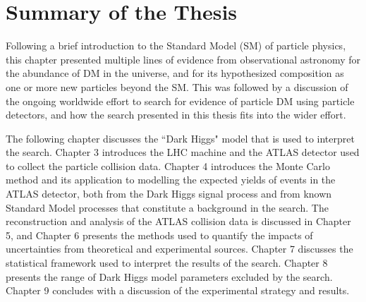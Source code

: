 \section{Summary of the Thesis}

Following a brief introduction to the Standard Model (SM) of particle physics, this chapter presented multiple lines of evidence from observational astronomy for the abundance of DM in the universe, and for its hypothesized composition as one or more new particles beyond the SM. This was followed by a discussion of the ongoing worldwide effort to search for evidence of particle DM using particle detectors, and how the search presented in this thesis fits into the wider effort. 

The following chapter discusses the ``Dark Higgs" model that is used to interpret the search. Chapter 3 introduces the LHC machine and the ATLAS detector used to collect the particle collision data. Chapter 4 introduces the Monte Carlo method and its application to modelling the expected yields of events in the ATLAS detector, both from the Dark Higgs signal process and from known Standard Model processes that constitute a background in the search. The reconstruction and analysis of the ATLAS collision data is discussed in Chapter 5, and Chapter 6 presents the methods used to quantify the impacts of uncertainties from theoretical and experimental sources. Chapter 7 discusses the statistical framework used to interpret the results of the search. Chapter 8 presents the range of Dark Higgs model parameters excluded by the search. Chapter 9 concludes with a discussion of the experimental strategy and results. 

